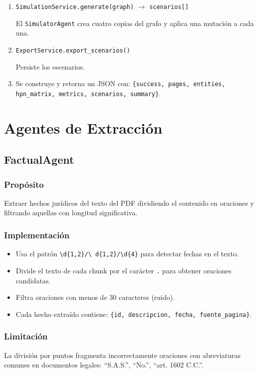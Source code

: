 \documentclass[12pt, letterpaper]{article}
\begin{document}
\begin{enumerate}[nosep]
    Persiste las métricas.

  \item \texttt{SimulationService.generate(graph)} $\rightarrow$
    \texttt{scenarios[]}

    El \texttt{SimulatorAgent} crea cuatro copias del grafo y
    aplica una mutación a cada una.

  \item \texttt{ExportService.export\_scenarios()}

    Persiste los escenarios.

  \item Se construye y retorna un JSON con:
    \texttt{\{success, pages, entities, hpn\_matrix, metrics,
    scenarios, summary\}}.
\end{enumerate}

\newpage
\section{Agentes de Extracción}

\subsection{FactualAgent}

\subsubsection*{Propósito}
Extraer hechos jurídicos del texto del PDF dividiendo el contenido
en oraciones y filtrando aquellas con longitud significativa.

\subsubsection*{Implementación}
\begin{itemize}[nosep]
  \item Usa el patrón \texttt{\textbackslash d\{1,2\}/\textbackslash
    d\{1,2\}/\textbackslash d\{4\}} para detectar fechas en el texto.
  \item Divide el texto de cada chunk por el carácter \texttt{.}
    para obtener oraciones candidatas.
  \item Filtra oraciones con menos de 30 caracteres (ruido).
  \item Cada hecho extraído contiene:
    \texttt{\{id, descripcion, fecha, fuente\_pagina\}}.
\end{itemize}

\subsubsection*{Limitación}
La división por puntos fragmenta incorrectamente oraciones con
abreviaturas comunes en documentos legales: ``S.A.S.'', ``No.'',
``art. 1602 C.C.''.
\end{document}
